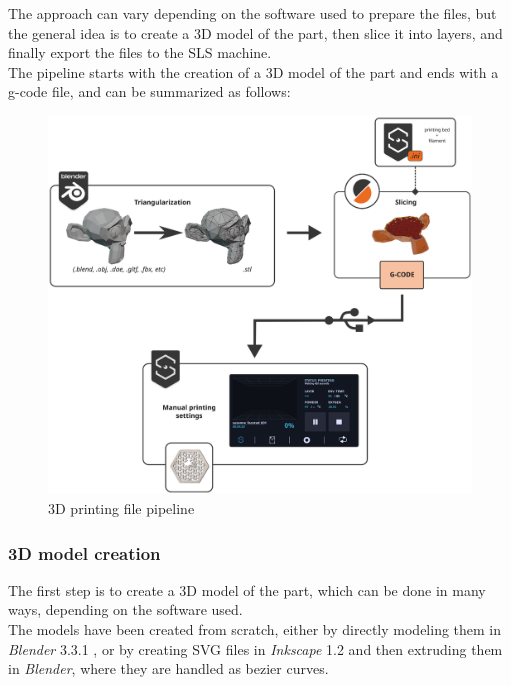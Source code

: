 \documentclass{article}
\begin{document}
        The approach can vary depending on the software used to prepare the files, but the general idea is to 
        create a 3D model of the part, then slice it into layers, and finally export the files to the SLS machine. \\

        The pipeline starts with the creation of a 3D model of the part and ends with a g-code file, and can 
        be summarized as follows: 
        
                \begin{figure}[h!]
                    \centering 
                    \includegraphics[width=\textwidth]{Pictures/3dprint_file_pipeline_scheme.eps}
                    \caption{3D printing file pipeline}
                    \label{fig:3dprint_file_pipeline_scheme}
                \end{figure}

        \subsubsection{3D model creation\label{3D_model_creation}}

        The first step is to create a 3D model of the part, which can be done in many ways, 
        depending on the software used. \\

        The models have been created from scratch, either by directly modeling them in \textit{Blender} 3.3.1 \autocites{Blender},
        or by creating SVG files in \textit{Inkscape} 1.2 \autocites{Inkscape} and then extruding them in \textit{Blender}, where
        they are handled as bezier curves. \\
\end{document}
